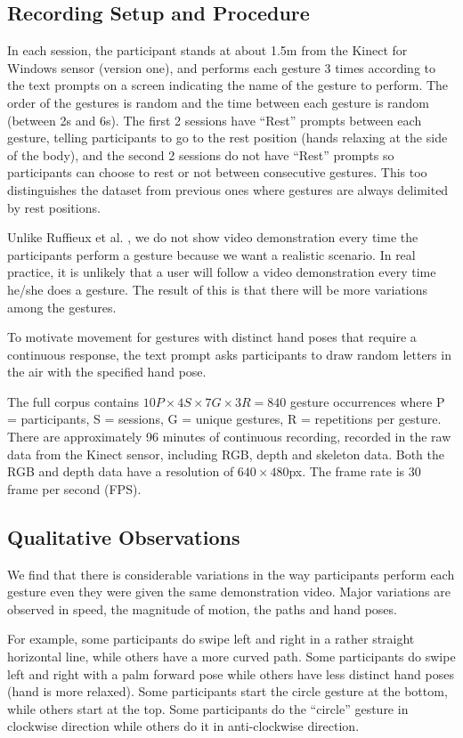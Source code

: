 \subsection{Recording Setup and Procedure}
In each session, the participant stands at about 1.5m from the Kinect
for Windows sensor (version one), and performs each gesture 3 times
according to the text prompts on a screen indicating the name of the gesture to
perform.
The order of the gestures is random and the time between each gesture is random
(between 2s and 6s). The first 2 sessions have ``Rest'' prompts between each
gesture, telling participants to go to the rest position (hands relaxing at the
side of the body), and the second 2 sessions do not have ``Rest'' prompts so
participants can choose to rest or not between consecutive gestures. This too
distinguishes the dataset from previous ones \cite{Ruffieux2013, guyon13} where
gestures are always delimited by rest positions.

Unlike Ruffieux et al. \cite{Ruffieux2013}, we do not show video demonstration
every time the participants perform a gesture because we want a
realistic scenario. In real practice, it is unlikely that a user will follow a
video demonstration every time he/she does a gesture. The result of this is that
there will be more variations among the gestures.

To motivate movement for gestures with distinct hand poses that
require a continuous response, the text prompt asks participants to draw
random letters in the air with the specified hand pose. 

The full corpus contains $
10P \times 4S \times 7G \times 3R = 840$ gesture occurrences
where P = participants, S = sessions, G = unique gestures, R = repetitions per
gesture. There are approximately 96 minutes of continuous recording,
recorded in the raw data from the Kinect sensor, including RGB, depth and
skeleton data. Both the RGB and depth data have a resolution of
$640\times480$px. The frame rate is 30 frame per second (FPS).

\subsection{Qualitative Observations}
We find that there is considerable variations in the way participants perform
each gesture even they were given the same demonstration video. Major variations
are observed in speed, the magnitude of motion, the paths and hand poses.

For example, some participants do swipe left and right in a rather straight
horizontal line, while others have a more curved path.  Some
participants do swipe left and right with a palm forward pose while others have
less distinct hand poses (hand is more relaxed). Some participants start
the circle gesture at the bottom, while others start at the top. Some
participants do the ``circle'' gesture in clockwise direction while others do it
in anti-clockwise direction.

